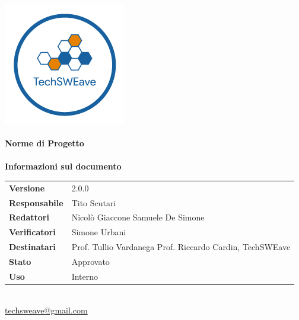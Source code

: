 \documentclass[a4paper]{article}
\begin{document}
\begin{titlepage}
    \begin{center}
        \includegraphics{../../../Images/logo}\\
        \vspace{20px}
        \textcolor{logo}{\hrulefill}\\
        \vspace{20px}
        \textbf{\huge\textcolor{logo}{Norme di Progetto}}\\
        \vspace{10px}
        \textcolor{logo}{\hrulefill}\\
        \vspace{40px}
        \textbf{\Large Informazioni sul documento}\\
        \vspace{20px}
        \begin{tabular}{p{100px} | p{100px}}
            \textbf{Versione}     & 2.0.0                                                                      \\
            \textbf{Responsabile} & Tito Scutari                                                               \\
            \textbf{Redattori}    & Nicolò Giaccone \newline Samuele De Simone                                 \\
            \textbf{Verificatori} & Simone Urbani                                                              \\
            \textbf{Destinatari}  & Prof. Tullio Vardanega \newline Prof. Riccardo Cardin, \newline TechSWEave \\
            \textbf{Stato}        & Approvato                                                                  \\
            \textbf{Uso}          & Interno                                                                    \\
        \end{tabular}\\
        \vspace{60px}
        \href{mailto:techsweave@gmail.com}{techsweave@gmail.com}\\
    \end{center}
\end{titlepage}
\end{document}
